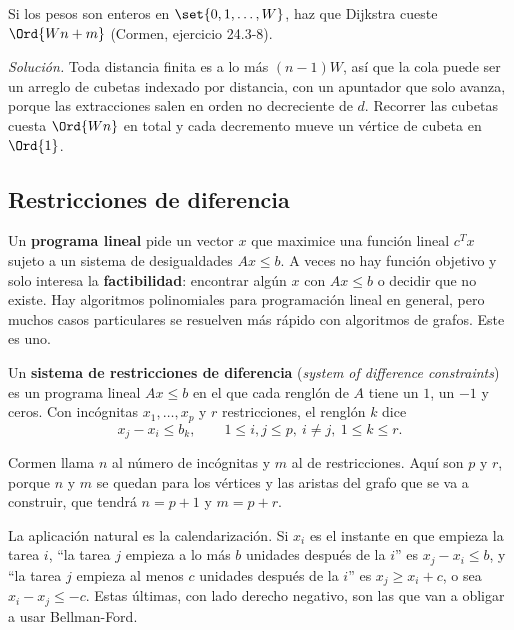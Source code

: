 \documentclass[11pt,letterpaper]{article}
\begin{document}
\begin{ejercicio}
  Si los pesos son enteros en $\set{0, 1, \dots, W}$, haz que Dijkstra
  cueste $\Ord{Wn + m}$ (Cormen, ejercicio 24.3-8).

  \textit{Solución.} Toda distancia finita es a lo más $(n - 1)W$,
  así que la cola puede ser un arreglo de cubetas indexado por
  distancia, con un apuntador que solo avanza, porque las extracciones
  salen en orden no decreciente de $d$. Recorrer las cubetas cuesta
  $\Ord{Wn}$ en total y cada decremento mueve un vértice de cubeta en
  $\Ord{1}$.
\end{ejercicio}


\subsection*{Restricciones de diferencia}

Un \textbf{programa lineal} pide un vector $x$ que maximice una
función lineal $c^{T} x$ sujeto a un sistema de desigualdades
$Ax \le b$. A veces no hay función objetivo y solo interesa la
\textbf{factibilidad}: encontrar algún $x$ con $Ax \le b$ o decidir
que no existe. Hay algoritmos polinomiales para programación lineal en
general, pero muchos casos particulares se resuelven más rápido con
algoritmos de grafos. Este es uno.

\begin{definicion}
  \label{def:restricciones-diferencia}
  Un \textbf{sistema de restricciones de diferencia} (\textit{system
  of difference constraints}) es un programa lineal $Ax \le b$ en el
  que cada renglón de $A$ tiene un $1$, un $-1$ y ceros. Con
  incógnitas $x_1, \dots, x_p$ y $r$ restricciones, el renglón $k$
  dice
  \[
    x_j - x_i \le b_k , \qquad 1 \le i, j \le p,\ i \neq j,\
    1 \le k \le r .
  \]
\end{definicion}

Cormen llama $n$ al número de incógnitas y $m$ al de restricciones.
Aquí son $p$ y $r$, porque $n$ y $m$ se quedan para los vértices y las
aristas del grafo que se va a construir, que tendrá $n = p + 1$ y
$m = p + r$.

La aplicación natural es la calendarización. Si $x_i$ es el instante
en que empieza la tarea $i$, ``la tarea $j$ empieza a lo más $b$
unidades después de la $i$'' es $x_j - x_i \le b$, y ``la tarea $j$
empieza al menos $c$ unidades después de la $i$'' es
$x_j \ge x_i + c$, o sea $x_i - x_j \le -c$. Estas últimas, con lado
derecho negativo, son las que van a obligar a usar Bellman-Ford.
\end{document}
